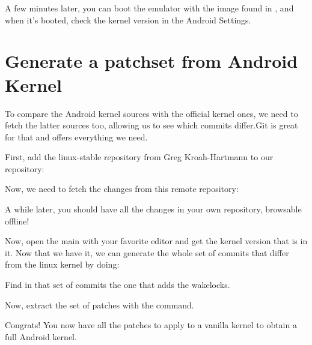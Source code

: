 
A few minutes later, you can boot the emulator with the image found in
, and when it's booted, check the kernel version in the
Android Settings.

\section{Generate a patchset from Android Kernel}

To compare the Android kernel sources with the official kernel ones,
we need to fetch the latter sources too, allowing us to see which 
commits differ.Git is great for that and offers everything we need.

First, add the linux-stable repository from Greg Kroah-Hartmann to our
repository:


Now, we need to fetch the changes from this remote repository:


A while later, you should have all the changes in your own repository, browsable
offline!

Now, open the main  with your favorite editor and get the kernel version
that is in it. Now that we have it, we can generate the whole set of commits that
differ from the linux kernel by doing:


Find in that set of commits the one that adds the wakelocks.

Now, extract the set of patches with the  command.

Congrats! You now have all the patches to apply to a vanilla kernel to obtain a
full Android kernel.
